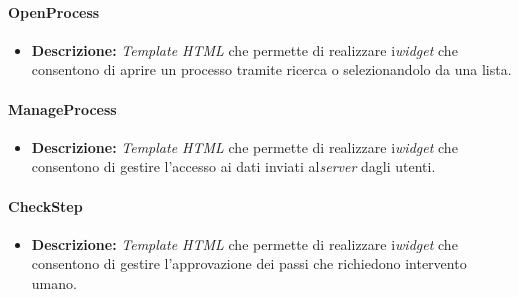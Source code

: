 \paragraph{OpenProcess}
\label{openProcessTemplate}
\begin{itemize}
\item \textbf{Descrizione:} \textit{Template HTML} che permette di realizzare i\textit{widget} che consentono di aprire un processo tramite ricerca o selezionandolo da una lista.
\end{itemize}

\paragraph{ManageProcess}
\label{manageProcessTemplate}
\begin{itemize}
\item \textbf{Descrizione:} \textit{Template HTML} che permette di realizzare i\textit{widget} che consentono di gestire l'accesso ai dati inviati al\textit{server} dagli utenti.
\end{itemize}

\paragraph{CheckStep}
\label{checkStepTemplate}
\begin{itemize}
\item \textbf{Descrizione:} \textit{Template HTML} che permette di realizzare i\textit{widget} che consentono di gestire l'approvazione dei passi che richiedono intervento umano.
\end{itemize}